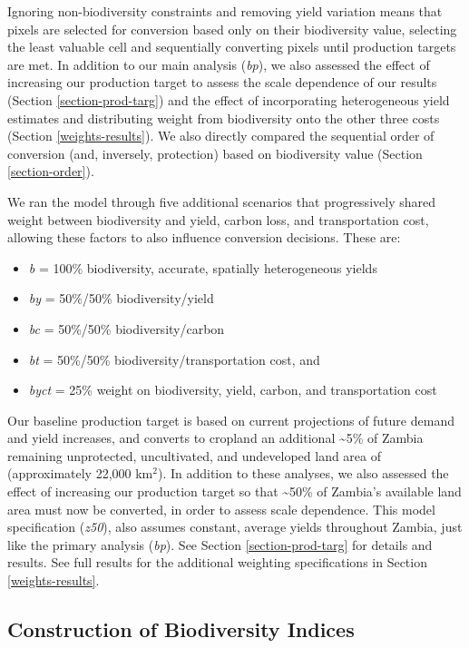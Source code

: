 \documentclass[
]{article}
\providecommand{\tightlist}{%
  \setlength{\itemsep}{0pt}\setlength{\parskip}{0pt}}
\begin{document}
Ignoring non-biodiversity constraints and removing yield variation means that pixels are selected for conversion based only on their biodiversity value, selecting the least valuable cell and sequentially converting pixels until production targets are met. In addition to our main analysis (\emph{bp}), we also assessed the effect of increasing our production target to assess the scale dependence of our results (Section \ref{section-prod-targ}) and the effect of incorporating heterogeneous yield estimates and distributing weight from biodiversity onto the other three costs (Section \ref{weights-results}). We also directly compared the sequential order of conversion (and, inversely, protection) based on biodiversity value (Section \ref{section-order}).

We ran the model through five additional scenarios that progressively shared weight between biodiversity and yield, carbon loss, and transportation cost, allowing these factors to also influence conversion decisions. These are:

\begin{itemize}
\tightlist
\item
  \emph{b} = 100\% biodiversity, accurate, spatially heterogeneous yields
\item
  \emph{by} = 50\%/50\% biodiversity/yield
\item
  \emph{bc} = 50\%/50\% biodiversity/carbon
\item
  \emph{bt} = 50\%/50\% biodiversity/transportation cost, and
\item
  \emph{byct} = 25\% weight on biodiversity, yield, carbon, and transportation cost
\end{itemize}

Our baseline production target is based on current projections of future demand and yield increases, and converts to cropland an additional \textasciitilde5\% of Zambia remaining unprotected, uncultivated, and undeveloped land area of (approximately 22,000 km\(^2\)). In addition to these analyses, we also assessed the effect of increasing our production target so that \textasciitilde50\% of Zambia's available land area must now be converted, in order to assess scale dependence. This model specification (\emph{z50}), also assumes constant, average yields throughout Zambia, just like the primary analysis (\emph{bp}). See Section \ref{section-prod-targ} for details and results. See full results for the additional weighting specifications in Section \ref{weights-results}.

\hypertarget{bd-inputs}{%
\subsection{Construction of Biodiversity Indices}\label{bd-inputs}}
\end{document}
